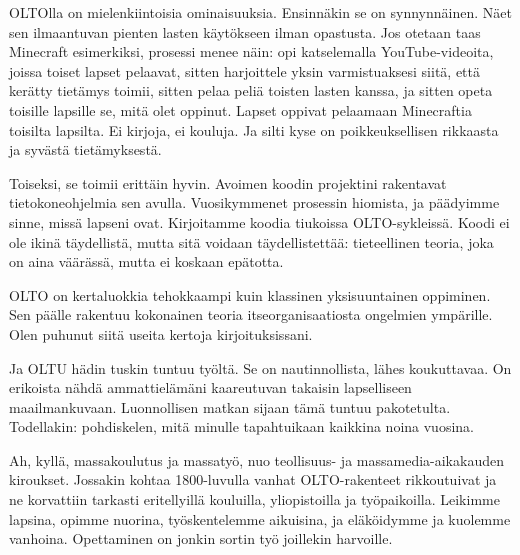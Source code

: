 OLTOlla on mielenkiintoisia ominaisuuksia. Ensinnäkin se on synnynnäinen. Näet sen ilmaantuvan pienten lasten käytökseen ilman opastusta. Jos otetaan taas Minecraft esimerkiksi, prosessi menee näin: opi katselemalla YouTube-videoita, joissa toiset lapset pelaavat, sitten harjoittele yksin varmistuaksesi siitä, että kerätty tietämys toimii, sitten pelaa peliä toisten lasten kanssa, ja sitten opeta toisille lapsille se, mitä olet oppinut. Lapset oppivat pelaamaan Minecraftia toisilta lapsilta. Ei kirjoja, ei kouluja. Ja silti kyse on poikkeuksellisen rikkaasta ja syvästä tietämyksestä.

Toiseksi, se toimii erittäin hyvin. Avoimen koodin projektini rakentavat tietokoneohjelmia sen avulla. Vuosikymmenet prosessin hiomista, ja päädyimme sinne, missä lapseni ovat. Kirjoitamme koodia tiukoissa OLTO-sykleissä. Koodi ei ole ikinä täydellistä, mutta sitä voidaan täydellistettää: tieteellinen teoria, joka on aina väärässä, mutta ei koskaan epätotta.

OLTO on kertaluokkia tehokkaampi kuin klassinen yksisuuntainen oppiminen. Sen päälle rakentuu kokonainen teoria itseorganisaatiosta ongelmien ympärille. Olen puhunut siitä useita kertoja kirjoituksissani.

Ja OLTU hädin tuskin tuntuu työltä. Se on nautinnollista, lähes koukuttavaa. On erikoista nähdä ammattielämäni kaareutuvan takaisin lapselliseen maailmankuvaan. Luonnollisen matkan sijaan tämä tuntuu pakotetulta. Todellakin: pohdiskelen, mitä minulle tapahtuikaan kaikkina noina vuosina.

Ah, kyllä, massakoulutus ja massatyö, nuo teollisuus- ja massamedia-aikakauden kiroukset. Jossakin kohtaa 1800-luvulla vanhat OLTO-rakenteet rikkoutuivat ja ne korvattiin tarkasti eritellyillä kouluilla, yliopistoilla ja työpaikoilla. Leikimme lapsina, opimme nuorina, työskentelemme aikuisina, ja eläköidymme ja kuolemme vanhoina. Opettaminen on jonkin sortin työ joillekin harvoille.

